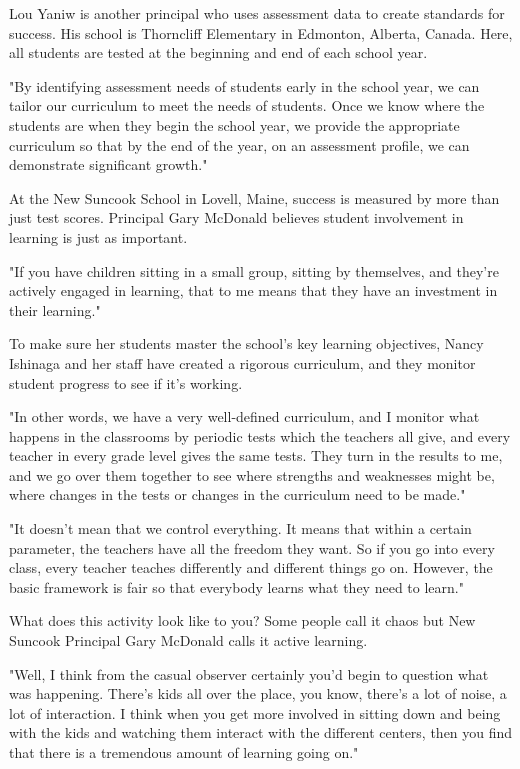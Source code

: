 Lou Yaniw is another principal who uses assessment data to create standards for success. His school is Thorncliff Elementary in Edmonton, Alberta, Canada. Here, all students are tested at the beginning and end of each school year.

"By identifying assessment needs of students early in the school year, we can tailor our curriculum to meet the needs of students. Once we know where the students are when they begin the school year, we provide the appropriate curriculum so that by the end of the year, on an assessment profile, we can demonstrate significant growth."

At the New Suncook School in Lovell, Maine, success is measured by more than just test scores. Principal Gary McDonald believes student involvement in learning is just as important.

"If you have children sitting in a small group, sitting by themselves, and they're actively engaged in learning, that to me means that they have an investment in their learning."

To make sure her students master the school's key learning objectives, Nancy Ishinaga and her staff have created a rigorous curriculum, and they monitor student progress to see if it's working.

"In other words, we have a very well-defined curriculum, and I monitor what happens in the classrooms by periodic tests which the teachers all give, and every teacher in every grade level gives the same tests. They turn in the results to me, and we go over them together to see where strengths and weaknesses might be, where changes in the tests or changes in the curriculum need to be made."

"It doesn't mean that we control everything. It means that within a certain parameter, the teachers have all the freedom they want. So if you go into every class, every teacher teaches differently and different things go on. However, the basic framework is fair so that everybody learns what they need to learn."

What does this activity look like to you? Some people call it chaos but New Suncook Principal Gary McDonald calls it active learning.

"Well, I think from the casual observer certainly you'd begin to question what was happening. There's kids all over the place, you know, there's a lot of noise, a lot of interaction. I think when you get more involved in sitting down and being with the kids and watching them interact with the different centers, then you find that there is a tremendous amount of learning going on."

